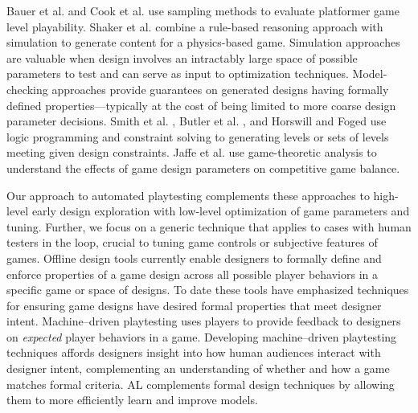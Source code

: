 \documentclass{sig-alternate}
\begin{document}
Bauer et al. \cite{bauer2013:rrt-generation} and Cook et al. \cite{cook2012:coopcoevo} use sampling methods to evaluate platformer game level playability.
Shaker et al. \cite{shaker2013:ropossum-test} combine a rule-based reasoning approach with simulation to generate content for a physics-based game.
Simulation approaches are valuable when design involves an intractably large space of possible parameters to test and can serve as input to optimization techniques.
%
Model-checking approaches provide guarantees on generated designs having formally defined properties---typically at the cost of being limited to more coarse design parameter decisions.
Smith et al. \cite{smith2013:quantify-play}, Butler et al. \cite{butler2013:progression-tool}, and Horswill and Foged \cite{horswill2012:levelgen} use logic programming and constraint solving to generating levels or sets of levels meeting given design constraints.
Jaffe et al. \cite{jaffe2012:balance} use game-theoretic analysis to understand the effects of game design parameters on competitive game balance.

Our approach to automated playtesting complements these approaches to high-level early design exploration with low-level optimization of game parameters and tuning.
Further, we focus on a generic technique that applies to cases with human testers in the loop, crucial to tuning game controls or subjective features of games.
%
Offline design tools currently enable designers to formally define and enforce properties of a game design across all possible player behaviors in a specific game or space of designs.
To date these tools have emphasized techniques for ensuring game designs have desired formal properties that meet designer intent.
%
Machine--driven playtesting uses players to provide feedback to designers on \textit{expected} player behaviors in a game.
Developing machine--driven playtesting techniques affords designers insight into how human audiences interact with designer intent, complementing an understanding of whether and how a game matches formal criteria.
AL complements formal design techniques by allowing them to more efficiently learn and improve models.
\end{document}

